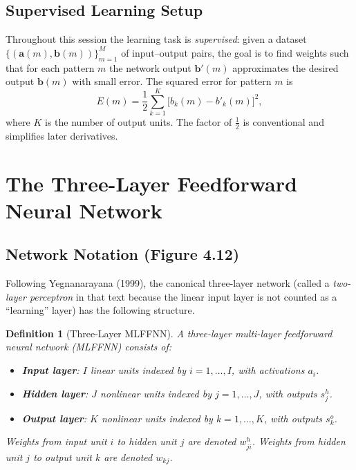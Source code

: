 \documentclass[12pt,a4paper]{article}
\newtheorem{definition}{Definition}[section]
\begin{document}
\subsection{Supervised Learning Setup}
\label{subsec:supervised}

Throughout this session the learning task is \emph{supervised}: given a
dataset $\{(\mathbf{a}(m), \mathbf{b}(m))\}_{m=1}^{M}$ of input--output
pairs, the goal is to find weights such that for each pattern $m$ the network
output $\mathbf{b}'(m)$ approximates the desired output $\mathbf{b}(m)$ with
small error.  The squared error for pattern $m$ is
\begin{equation}
  E(m) = \frac{1}{2}\sum_{k=1}^{K}\bigl[b_k(m) - b'_k(m)\bigr]^2,
  \label{eq:error}
\end{equation}
where $K$ is the number of output units.  The factor of $\tfrac{1}{2}$ is
conventional and simplifies later derivatives.

\section{The Three-Layer Feedforward Neural Network}
\label{sec:architecture}

\subsection{Network Notation (Figure 4.12)}
\label{subsec:notation}

Following Yegnanarayana (1999), the canonical three-layer network (called a
\emph{two-layer perceptron} in that text because the linear input layer is not
counted as a ``learning'' layer) has the following structure.

\begin{definition}[Three-Layer MLFFNN]
  \label{def:threelayer}
  A three-layer multi-layer feedforward neural network (MLFFNN) consists of:
  \begin{itemize}
    \item \textbf{Input layer}: $I$ linear units indexed by $i = 1,\ldots,I$,
      with activations $a_i$.
    \item \textbf{Hidden layer}: $J$ nonlinear units indexed by $j = 1,\ldots,J$,
      with outputs $s_j^h$.
    \item \textbf{Output layer}: $K$ nonlinear units indexed by $k = 1,\ldots,K$,
      with outputs $s_k^o$.
  \end{itemize}
  Weights from input unit $i$ to hidden unit $j$ are denoted $w_{ji}^h$.
  Weights from hidden unit $j$ to output unit $k$ are denoted $w_{kj}$.
\end{definition}
\end{document}
